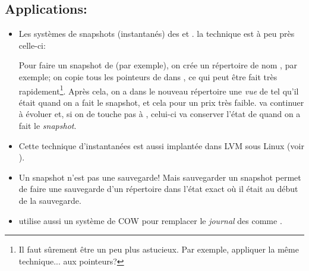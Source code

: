  \subsection*{Applications:}
\begin{itemize}
  \item Les systèmes de \og snapshots\fg{} (instantanés)  des \sffs{}
     et . la technique est à peu près celle-ci:

    Pour faire un snapshot de  (par exemple), on crée un
    répertoire de nom , par exemple; on copie tous les
    pointeurs de  dans , ce qui peut être
    fait très rapidement\footnote{Il faut sûrement être un peu plus
      astucieux. Par exemple, appliquer la même technique... aux
      pointeurs?}. Après cela, on a dans le nouveau répertoire 
    une \emph{vue} de  tel qu'il était quand on a fait le
    snapshot, et cela pour un \og prix\fg{} très faible.  va
    continuer à évoluer et, si on de touche pas à , celui-ci
    va conserver l'état de  quand on a fait le \emph{snapshot}.
  \item Cette technique d'instantanées est aussi implantée dans LVM
    sous Linux (voir \cite{lvm}).
  \item Un \og snapshot\fg{} n'est pas une sauvegarde! Mais
    sauvegarder un  \og snapshot\fg{} permet de faire une sauvegarde
    d'un répertoire dans l'état exact où il était au début de la
    sauvegarde.
  \item {} utilise aussi un système de \og COW\fg{} pour
    remplacer le \emph{journal} des \sffs{} comme .
\end{itemize}

